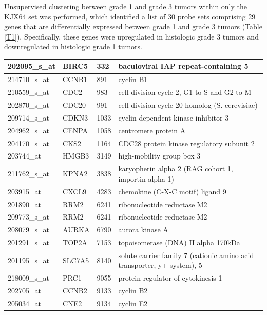 \documentclass[a4paper,10pt]{article}
\begin{document}
Unsupervised clustering between grade 1 and grade 3 tumors within only the 
KJX64 set was performed, which identified a list of 30 probe sets comprising 
29 genes that are differentially expressed between grade 1 and grade 3 tumors 
(Table \ref{T1}).  Specifically, these genes were upregulated in histologic grade 3 tumors 
and downregulated in histologic grade 1 tumors.  \\



\begin{table}
\begin{tabular}{| l | l | l | l | }
    \hline
202095\_s\_at & BIRC5 & 332 & baculoviral IAP repeat-containing 5\\ \hline 
214710\_s\_at & CCNB1 & 891 & cyclin B1\\ \hline 
210559\_s\_at & CDC2 & 983 & cell division cycle 2, G1 to S and G2 to M\\ \hline 
202870\_s\_at & CDC20 & 991 & cell division cycle 20 homolog (S. cerevisiae)\\ \hline 
209714\_s\_at & CDKN3 & 1033 & cyclin-dependent kinase inhibitor 3\\ \hline 
204962\_s\_at & CENPA & 1058 & centromere protein A\\ \hline 
204170\_s\_at & CKS2 & 1164 & CDC28 protein kinase regulatory subunit 2\\ \hline 
203744\_at & HMGB3 & 3149 & high-mobility group box 3\\ \hline 
211762\_s\_at & KPNA2 & 3838 & karyopherin alpha 2 (RAG cohort 1, importin alpha 1)\\ \hline 
203915\_at & CXCL9 & 4283 & chemokine (C-X-C motif) ligand 9\\ \hline 
201890\_at & RRM2 & 6241 & ribonucleotide reductase M2\\ \hline 
209773\_s\_at & RRM2 & 6241 & ribonucleotide reductase M2\\ \hline 
208079\_s\_at & AURKA & 6790 & aurora kinase A\\ \hline 
201291\_s\_at & TOP2A & 7153 & topoisomerase (DNA) II alpha 170kDa\\ \hline 
201195\_s\_at & SLC7A5 & 8140 & solute carrier family 7 (cationic amino acid transporter, y+ system), 5\\ \hline 
218009\_s\_at & PRC1 & 9055 & protein regulator of cytokinesis 1\\ \hline 
202705\_at & CCNB2 & 9133 & cyclin B2\\ \hline 
205034\_at & CNE2 & 9134 & cyclin E2\\ \hline 

\end{tabular}
\end{table}
\end{document}

